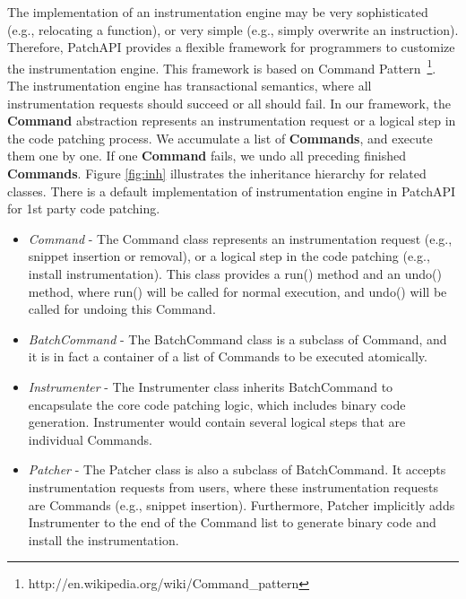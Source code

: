 The implementation of an instrumentation engine may be very sophisticated (e.g.,
relocating a function), or very simple (e.g., simply overwrite an
instruction). Therefore, PatchAPI provides a flexible framework for programmers
to customize the instrumentation engine. This framework is based on Command
Pattern~\footnote{http://en.wikipedia.org/wiki/Command\_pattern}. The
instrumentation engine has transactional semantics, where all instrumentation
requests should succeed or all should fail. In our framework, the
\textbf{Command} abstraction represents an instrumentation request or a logical
step in the code patching process. We accumulate a list of \textbf{Commands},
and execute them one by one. If one \textbf{Command} fails, we undo all
preceding finished \textbf{Commands}. Figure \ref{fig:inh} illustrates the
inheritance hierarchy for related classes. There is a default implementation of
instrumentation engine in PatchAPI for 1st party code patching.

\begin{itemize}
\item \emph{Command} - The Command class represents an instrumentation request (e.g.,
    snippet insertion or removal), or a logical step in the code patching (e.g.,
    install instrumentation). This class provides a run() method and an undo()
    method, where run() will be called for normal execution, and undo() will be
    called for undoing this Command.
\item \emph{BatchCommand} - The BatchCommand class is a subclass of Command, and it is
    in fact a container of a list of Commands to be executed atomically.
\item \emph{Instrumenter} - The Instrumenter class inherits BatchCommand to encapsulate
    the core code patching logic, which includes binary code generation.
    Instrumenter would contain several logical steps that are individual
    Commands.
\item \emph{Patcher} - The Patcher class is also a subclass of BatchCommand. It accepts
    instrumentation requests from users, where these instrumentation requests
    are Commands (e.g., snippet insertion). Furthermore, Patcher implicitly adds
    Instrumenter to the end of the Command list to generate binary code and
    install the instrumentation.
\end{itemize}
